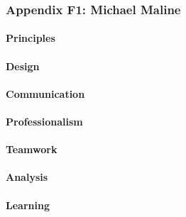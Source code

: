 \documentclass[../../main.tex]{subfiles}
\begin{document}
\subsubsection{Appendix F1: Michael Maline}

\paragraph{Principles}


\paragraph{Design}


\paragraph{Communication}


\paragraph{Professionalism}


\paragraph{Teamwork}


\paragraph{Analysis}


\paragraph{Learning}
\end{document}
